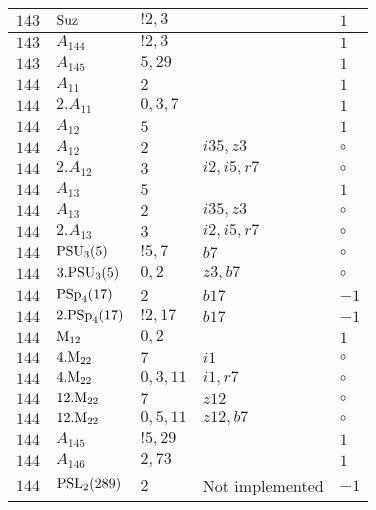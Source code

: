 \documentclass[a4paper, 11pt]{article}
\begin{document}
\begin{longtable}{lllll}
        $ 143 $ & $ {\rm Suz} $ & $ ! 2,3 $ & $ ~ $ & $ 1$ \\ \hline
        $ 143 $ & $ A_{144} $ & $ !2, 3 $ & $ ~ $ & $ 1$ \\ \hline
        $ 143 $ & $ A_{145} $ & $ 5, 29 $ & $ ~ $ & $ 1$ \\ \hline
        $ 144 $ & $ A_{11} $ & $ 2 $ & $ ~ $ & $ 1$ \\ \hline
        $ 144 $ & $ 2.A_{11} $ & $ 0,3,7 $ & $ ~ $ & $ 1$ \\ \hline
        $ 144 $ & $ A_{12} $ & $ 5 $ & $ ~ $ & $ 1$ \\ \hline
        $ 144 $ & $ A_{12} $ & $ 2 $ & $ i35, z3 $ &  $\circ$ \\ \hline
        $ 144 $ & $ 2.A_{12} $ & $ 3 $ & $ i2, i5, r7 $ &  $\circ$ \\ \hline
        $ 144 $ & $ A_{13} $ & $ 5 $ & $ ~ $ & $ 1$ \\ \hline
        $ 144 $ & $ A_{13} $ & $ 2 $ & $ i35, z3 $ &  $\circ$ \\ \hline
        $ 144 $ & $ 2.A_{13} $ & $ 3 $ & $ i2, i5, r7 $ &  $\circ$ \\ \hline
        $ 144 $ & $ {\rm PSU}_{3}(5) $ & $ ! 5,7 $ & $ b7 $ &  $\circ$ \\ \hline
        $ 144 $ & $ 3.{\rm PSU}_{3}(5) $ & $ 0, 2 $ & $ z3, b7 $ &  $\circ$ \\ \hline
        $ 144 $ & $ {\rm PSp}_{4}(17) $ & $ 2 $ & $ b17 $ & $ -1$ \\ \hline
        $ 144 $ & $ 2.{\rm PSp}_{4}(17) $ & $ ! 2,17 $ & $ b17 $ & $ -1$ \\ \hline
        $ 144 $ & $ {\rm M}_{12} $ & $ 0, 2 $ & $ ~ $ & $ 1$ \\ \hline
        $ 144 $ & $ 4.{\rm M}_{22} $ & $ 7 $ & $ i1 $ &  $\circ$ \\ \hline
        $ 144 $ & $ 4.{\rm M}_{22} $ & $ 0,3,11 $ & $ i1, r7 $ &  $\circ$ \\ \hline
        $ 144 $ & $ 12.{\rm M}_{22} $ & $ 7 $ & $ z12 $ &  $\circ$ \\ \hline
        $ 144 $ & $ 12.{\rm M}_{22} $ & $ 0,5,11 $ & $ z12, b7 $ &  $\circ$ \\ \hline
        $ 144 $ & $ A_{145} $ & $ !5, 29 $ & $ ~ $ & $ 1$ \\ \hline
        $ 144 $ & $ A_{146} $ & $ 2, 73 $ & $ ~ $ & $ 1$ \\ \hline
        $ 144 $ & $ {\rm PSL}_{2}(289) $ & $ 2 $ &  Not implemented & $ -1$ \\ \hline

\end{longtable}
\end{document}
